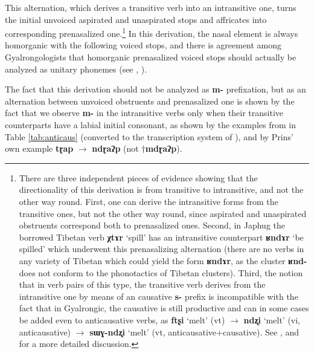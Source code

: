 \documentclass[oneside,a4paper,11pt]{article}
\newcommand{\ipa}[1]{\textbf{{\phon\mbox{#1}}}} %
\begin{document}
This alternation, which derives a transitive verb into an intransitive one, turns the initial unvoiced aspirated and unaspirated stops and affricates into corresponding prenasalized one.\footnote{There are three independent pieces of evidence showing that the directionality of this derivation is from transitive to intransitive, and not the other way round. First, one can derive the intransitive forms from the transitive ones, but not the other way round, since aspirated and unaspirated obstruents correspond both to prenasalized ones. Second, in Japhug the borrowed Tibetan verb \ipa{χtɤr} `spill' has an intransitive counterpart \ipa{ʁndɤr} `be spilled' which underwent this prenasalizing alternation (there are no verbs in any variety of Tibetan which could yield the form \ipa{ʁndɤr}, as the cluster \ipa{ʁnd-} does not conform to the phonotactics of Tibetan clusters). Third, the notion that in verb pairs of this type, the transitive verb derives from the intransitive one by means of an causative \ipa{s-} prefix is incompatible with the fact that in Gyalrongic, the causative is still productive and can in some cases be added even to anticausative verbs, as \ipa{ftʂi} `melt' (vt) $\rightarrow$ \ipa{ndʐi} `melt' (vi, anticausative) $\rightarrow$ \ipa{sɯɣ-ndʐi} `melt' (vt, anticausative+causative). See \citet{jacques15spontaneous}, \citet{jacques15causative} and \citet{gong17xingtaixue} for a more detailed discussion. } In this derivation, the nasal element is always homorganic with the following voiced stops, and there is agreement among Gyalrongologists that homorganic prenasalized voiced stops should actually be analyzed as unitary phonemes (see \citealt{jackson03caodeng}, \citealt[8-9]{jacques08}).

The fact that this derivation should not be analyzed as \ipa{m-} prefixation, but as an alternation between unvoiced obstruents and prenasalized one is shown by the fact that we observe \ipa{m-} in the intransitive verbs only when their transitive counterparts have a labial initial consonant, as shown by the examples from \citet[193-4]{linxr93jiarong} in Table \ref{tab:anticaus} (converted to the transcription system of \citealt{huangsun02}), and by Prins' own example \ipa{tɽap} $\rightarrow$ \ipa{ndɽaʔp} (not $\dagger$\ipa{mdɽaʔp}).
\end{document}
